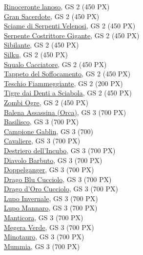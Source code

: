 \begin{multicols}{3}
{\hyperlink{Rinoceronte lanoso}{Rinoceronte lanoso}, GS 2 (450 PX)\\
\hyperlink{Gran Sacerdote}{Gran Sacerdote}, GS 2 (450 PX)\\
\hyperlink{Sciame di Serpenti Velenosi}{Sciame di Serpenti Velenosi}, GS 2 (450 PX)\\
\hyperlink{Serpente Costrittore Gigante}{Serpente Costrittore Gigante}, GS 2 (450 PX)\\
\hyperlink{Sibilante}{Sibilante}, GS 2 (450 PX)\\
\hyperlink{Silku}{Silku}, GS 2 (450 PX)\\
\hyperlink{Squalo Cacciatore}{Squalo Cacciatore}, GS 2 (450 PX)\\
\hyperlink{Tappeto del Soffocamento}{Tappeto del Soffocamento}, GS 2 (450 PX)\\
\hyperlink{Teschio Fiammeggiante}{Teschio Fiammeggiante}, GS 2 (200 PX)\\
\hyperlink{Tigre dai Denti a Sciabola}{Tigre dai Denti a Sciabola}, GS 2 (450 PX)\\
\hyperlink{Zombi Ogre}{Zombi Ogre}, GS 2 (450 PX)\\
\hyperlink{Balena Assassina (Orca)}{Balena Assassina (Orca)}, GS 3 (700 PX)\\
\hyperlink{Basilisco}{Basilisco}, GS 3 (700 PX)\\
\hyperlink{Campione Gablin}{Campione Gablin}, GS 3 (700)\\
\hyperlink{Cavaliere}{Cavaliere}, GS 3 (700 PX)\\
\hyperlink{Destriero dell'Incubo}{Destriero dell'Incubo}, GS 3 (700 PX)\\
\hyperlink{Diavolo Barbuto}{Diavolo Barbuto}, GS 3 (700 PX)\\
\hyperlink{Doppelganger}{Doppelganger}, GS 3 (700 PX)\\
\hyperlink{Drago Blu Cucciolo}{Drago Blu Cucciolo}, GS 3 (700 PX)\\
\hyperlink{Drago d'Oro Cucciolo}{Drago d'Oro Cucciolo}, GS 3 (700 PX)\\
\hyperlink{Lupo Invernale}{Lupo Invernale}, GS 3 (700 PX)\\
\hyperlink{Lupo Mannaro}{Lupo Mannaro}, GS 3 (700 PX)\\
\hyperlink{Manticora}{Manticora}, GS 3 (700 PX)\\
\hyperlink{Megera Verde}{Megera Verde}, GS 3 (700 PX)\\
\hyperlink{Minotauro}{Minotauro}, GS 3 (700 PX)\\
\hyperlink{Mummia}{Mummia}, GS 3 (700 PX)\\
}
\end{multicols}

